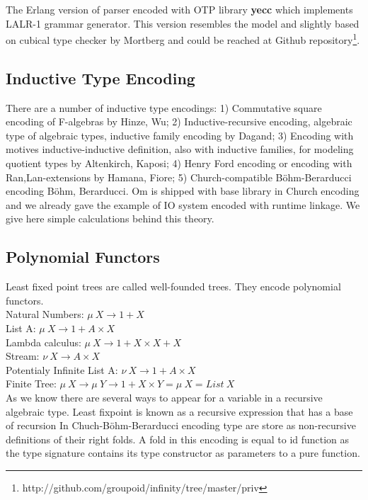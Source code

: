 \documentclass{aip-cp}
\begin{document}
The Erlang version of parser encoded with OTP library {\bf yecc} which implements
LALR-1 grammar generator. This version resembles the model and slightly based on cubical
type checker by Mortberg\cite{Mortberg17} and could be reached at Github
repository\footnote{http://github.com/groupoid/infinity/tree/master/priv}.

\subsection{Inductive Type Encoding}
There are a number of inductive type encodings: 1) Commutative square encoding of
F-algebras by Hinze, Wu\cite{Hinze13}; 2) Inductive-recursive encoding, algebraic type
of algebraic types, inductive family encoding by Dagand\cite{Dagand13};
3) Encoding with motives inductive-inductive definition, also with inductive families,
for modeling quotient types by Altenkirch, Kaposi\cite{Kaposi16};
4) Henry Ford encoding or encoding with Ran,Lan-extensions by Hamana, Fiore\cite{Hamana11};
5) Church-compatible Böhm-Berarducci encoding Böhm, Berarducci\cite{Bohm85}. Om is shipped with
base library in Church encoding and we already gave the example of IO system encoded with
runtime linkage. We give here simple calculations behind this theory.

\subsection{Polynomial Functors}
Least fixed point trees are called well-founded trees.
They encode polynomial functors.\\

\noindent Natural Numbers: $\mu\ X \rightarrow 1 + X$\\
List A: $\mu\ X \rightarrow 1 + A \times X$\\
Lambda calculus: $\mu\ X \rightarrow 1 + X \times X + X$\\
Stream: $\nu\ X \rightarrow A \times X$\\
Potentialy Infinite List A: $\nu\ X \rightarrow 1 + A \times X$\\
Finite Tree: $\mu\ X \rightarrow \mu\ Y \rightarrow 1 + X \times Y = \mu\ X = List\ X$\\

As we know there are several ways to appear for a variable in a recursive algebraic type.
Least fixpoint is known as a recursive expression that has a base of recursion
In Chuch-Böhm-Berarducci encoding type are store as non-recursive definitions
of their right folds. A fold in this encoding is equal to id function as the type
signature contains its type constructor as parameters to a pure function.
\end{document}

